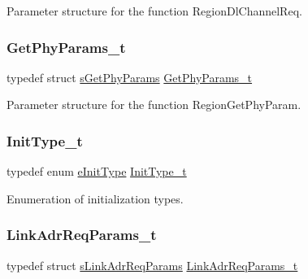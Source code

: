 Parameter structure for the function Region\+Dl\+Channel\+Req. \mbox{\label{group___r_e_g_i_o_n_gab471483fff904f4f89bbc03f7fc380ab}} 
\subsubsection{\texorpdfstring{Get\+Phy\+Params\+\_\+t}{GetPhyParams\_t}}
{\footnotesize\ttfamily typedef struct \mbox{\hyperlink{structs_get_phy_params}{s\+Get\+Phy\+Params}} \mbox{\hyperlink{group___r_e_g_i_o_n_gab471483fff904f4f89bbc03f7fc380ab}{Get\+Phy\+Params\+\_\+t}}}

Parameter structure for the function Region\+Get\+Phy\+Param. \mbox{\label{group___r_e_g_i_o_n_gaddc73ae10673ec925724e7870363bda9}} 
\subsubsection{\texorpdfstring{Init\+Type\+\_\+t}{InitType\_t}}
{\footnotesize\ttfamily typedef enum \mbox{\hyperlink{group___r_e_g_i_o_n_ga11ecad794560a3d3961bdf1c9a27d3b2}{e\+Init\+Type}} \mbox{\hyperlink{group___r_e_g_i_o_n_gaddc73ae10673ec925724e7870363bda9}{Init\+Type\+\_\+t}}}

Enumeration of initialization types. \mbox{\label{group___r_e_g_i_o_n_gad4af503e8d4de1846129e26a799a1e8e}} 
\subsubsection{\texorpdfstring{Link\+Adr\+Req\+Params\+\_\+t}{LinkAdrReqParams\_t}}
{\footnotesize\ttfamily typedef struct \mbox{\hyperlink{structs_link_adr_req_params}{s\+Link\+Adr\+Req\+Params}} \mbox{\hyperlink{group___r_e_g_i_o_n_gad4af503e8d4de1846129e26a799a1e8e}{Link\+Adr\+Req\+Params\+\_\+t}}}

